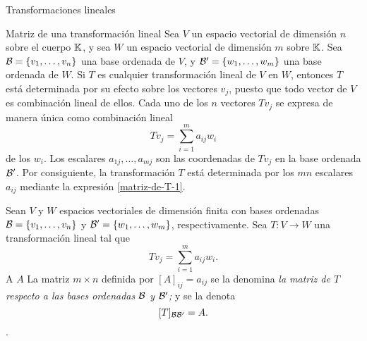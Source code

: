 \begin{chapter}{Transformaciones lineales}
        \begin{section}{Matriz de una transformaci\'on lineal}\label{seccion-matriz-de-una-tl}
            Sea $V$ un espacio vectorial de dimensión $n$ sobre el cuerpo $\mathbb K$, y sea $W$ un espacio vectorial de dimensión $m$ sobre $\mathbb K$. Sea $\mathcal{B} = \{v_1,\ldots,v_n\}$ una base ordenada de $V$, y $\mathcal{B}' = \{w_1,\ldots,w_m\}$ una base ordenada de $W$. Si $T$ es cualquier 		transformación lineal de $V$ en $W$, entonces $T$ está determinada por su efecto sobre los vectores $v_j$, puesto que todo vector de $V$ es combinación lineal de ellos. Cada uno de los $n$ vectores $Tv_j$ se expresa de manera única 	como combinación lineal
            \begin{equation}\label{matriz-de-T-1}
                Tv_j = \sum_{i=1}^{m} a_{ij} w_i
            \end{equation}
            de los $w_i$. Los escalares $a_{1j},\ldots,a_{mj}$ son las coordenadas de $Tv_j$ en la base ordenada $\mathcal{B}'$. Por consiguiente, la transformación $T$ está determinada por los
            $mn$ escalares $a_{ij}$ mediante la expresión \eqref{matriz-de-T-1}. 
            
            \begin{definicion} Sean $V$ y $W$ espacios vectoriales de dimensión finita con bases ordenadas $\mathcal{B} = \{v_1,\ldots,v_n\}$  y $\mathcal{B}' = \{w_1,\ldots,w_m\}$, respectivamente. Sea $T: V \to W$ una transformación lineal tal que 
                \begin{equation*}\label{matriz-de-T-1}
                    Tv_j = \sum_{i=1}^{m} a_{ij} w_i.
                \end{equation*}
                A  $A$  La matriz $m \times n$  definida por $[A]_{ij} = a_{ij}$ se la  denomina \textit{la matriz de $T$ respecto a las bases ordenadas $\mathcal{B}$ y $\mathcal{B}'$;} y se la denota 
                $$
                [T]_{\mathcal{B} \mathcal{B}'} = A .
                $$.
            \end{definicion}
            

\end{section}
\end{chapter}
